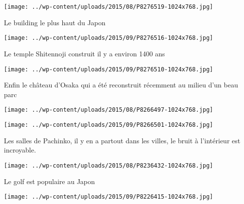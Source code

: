  

 

\begin{center} \texttt{[image: ../wp-content/uploads/2015/08/P8276519-1024x768.jpg]} \end{center}

 

 Le building le plus haut du Japon 

 

\begin{center} \texttt{[image: ../wp-content/uploads/2015/09/P8276516-1024x768.jpg]} \end{center}

 

 Le temple Shitennoji construit il y a environ 1400 ans 

 

\begin{center} \texttt{[image: ../wp-content/uploads/2015/09/P8276510-1024x768.jpg]} \end{center}

 

 Enfin le château d'Osaka qui a été reconstruit récemment au milieu d'un beau parc 

 

\begin{center} \texttt{[image: ../wp-content/uploads/2015/08/P8266497-1024x768.jpg]} \end{center}

 

 

\begin{center} \texttt{[image: ../wp-content/uploads/2015/09/P8266501-1024x768.jpg]} \end{center}

 

 Les salles de Pachinko, il y en a partout dans les villes, le bruit à l'intérieur est incroyable. 

 

\begin{center} \texttt{[image: ../wp-content/uploads/2015/08/P8236432-1024x768.jpg]} \end{center}

 

 Le golf est populaire au Japon 

 

\begin{center} \texttt{[image: ../wp-content/uploads/2015/09/P8226415-1024x768.jpg]} \end{center}

